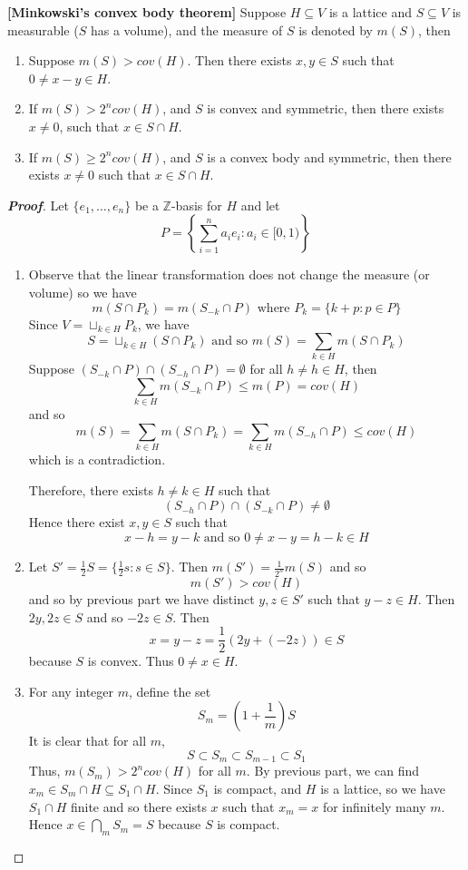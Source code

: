 \begin{theorem}{\bf [Minkowski's convex body theorem]}\label{M;Minkowski convex}
Suppose $H \subseteq V$ is a lattice and $S \subseteq V$ is measurable ($S$ has a volume), and the measure of
$S$ is denoted by $m(S)$, then
\begin{enumerate}
\item Suppose $m(S)> cov(H)$. Then there exists $x,y \in S$ such that $0 \neq x-y \in H$.
\item If $m(S)>2^n cov(H)$, and $S$ is convex and symmetric, then there exists $x \neq 0$, such that
$x \in S \cap H$.
\item If $m(S) \ge 2^n cov(H)$, and $S$ is a convex body and symmetric, then there exists $x \neq 0$ such that
$x \in S \cap H$.
\end{enumerate}
\end{theorem}
\begin{proof}[\bf Proof] Let $\{e_1,\ldots,e_n\}$ be a $\mathbb{Z}$-basis for $H$ and let
$$P=\left\{\sum_{i=1}^n a_ie_i: a_i \in [0,1)\right\}$$
\begin{enumerate}
\item Observe that the linear transformation does not change the measure (or volume) so we have
$$m(S \cap P_k)=m(S_{-k} \cap P) \text{ where } P_k=\{k+p: p \in P\}$$
Since $V=\sqcup_{k \in H}P_k$, we have
$$S=\sqcup_{k \in H}(S \cap P_k) \text{ and so } m(S)=\sum_{k \in H}m(S \cap P_k)$$
Suppose $(S_{-k} \cap P) \cap (S_{-h} \cap P)=\emptyset$ for all $h \neq h \in H$, then
$$\sum_{k \in H}m(S_{-k} \cap P) \le m(P) =cov(H)$$
and so
$$m(S)=\sum_{k \in H}m(S \cap P_k)=\sum_{k \in H}m(S_{-h} \cap P) \le cov(H)$$
which is a contradiction.

Therefore, there exists $h \neq k \in H$ such that
$$(S_{-h} \cap P) \cap (S_{-k} \cap P) \neq \emptyset$$
Hence there exist $x,y \in S$ such that
$$x-h=y-k \text{ and so } 0\neq x-y=h-k \in H$$
\item Let $S'=\frac{1}{2}S=\{\frac{1}{2}s: s \in S\}$. Then $m(S')=\frac{1}{2^n}m(S)$ and so
$$m(S')>cov(H)$$
and so by previous part we have distinct $y,z \in S'$ such that $y-z \in H$.
Then $2y,2z \in S$ and so $-2z \in S$. Then
$$x=y-z=\frac{1}{2}\left(2y +(-2z)\right) \in S$$
because $S$ is convex. Thus $0 \neq x \in H$.
\item For any integer $m$, define the set
$$S_m=\left(1+\frac{1}{m}\right)S$$
It is clear that for all $m$,
$$S \subset S_m \subset S_{m-1} \subset S_1$$
Thus, $m(S_m) >2^n cov(H)$ for all $m$. By previous part, we can find
$x_m \in S_m \cap H \subseteq S_1 \cap H$. Since $S_1$ is compact, and $H$ is a lattice, so we have
$S_1 \cap H$ finite and so there exists $x$ such that $x_m=x$ for infinitely many $m$.
Hence $x \in \bigcap_m S_m=S$ because $S$ is compact.
\end{enumerate}
\end{proof}
